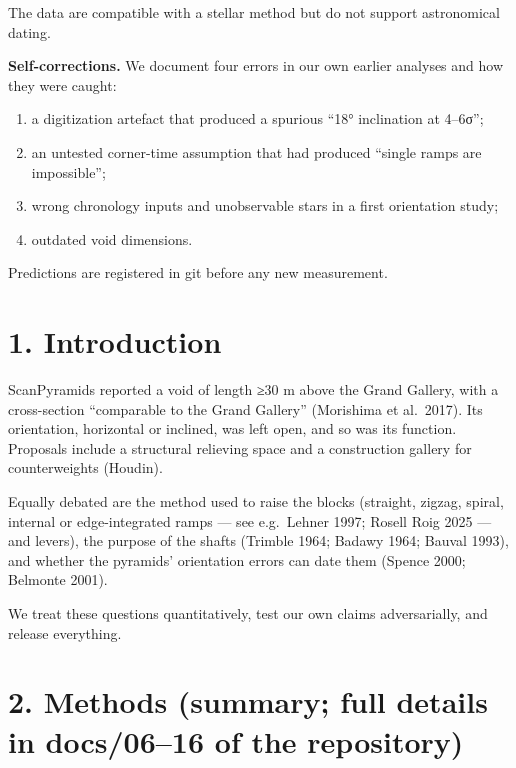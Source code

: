 \documentclass[
]{article}
\providecommand{\tightlist}{%
  \setlength{\itemsep}{0pt}\setlength{\parskip}{0pt}}
\begin{document}
The data are compatible with a stellar method but do not support
astronomical dating.

\textbf{Self-corrections.} We document four errors in our own earlier
analyses and how they were caught:

\begin{enumerate}
\def\labelenumi{\arabic{enumi}.}
\tightlist
\item
  a digitization artefact that produced a spurious ``18° inclination at
  4--6σ'';
\item
  an untested corner-time assumption that had produced ``single ramps
  are impossible'';
\item
  wrong chronology inputs and unobservable stars in a first orientation
  study;
\item
  outdated void dimensions.
\end{enumerate}

Predictions are registered in git before any new measurement.

\hypertarget{introduction}{%
\section{1. Introduction}\label{introduction}}

ScanPyramids reported a void of length ≥30 m above the Grand Gallery,
with a cross-section ``comparable to the Grand Gallery'' (Morishima et
al.~2017). Its orientation, horizontal or inclined, was left open, and
so was its function. Proposals include a structural relieving space and
a construction gallery for counterweights (Houdin).

Equally debated are the method used to raise the blocks (straight,
zigzag, spiral, internal or edge-integrated ramps --- see e.g.~Lehner
1997; Rosell Roig 2025 --- and levers), the purpose of the shafts
(Trimble 1964; Badawy 1964; Bauval 1993), and whether the pyramids'
orientation errors can date them (Spence 2000; Belmonte 2001).

We treat these questions quantitatively, test our own claims
adversarially, and release everything.

\hypertarget{methods-summary-full-details-in-docs0616-of-the-repository}{%
\section{2. Methods (summary; full details in docs/06--16 of the
repository)}\label{methods-summary-full-details-in-docs0616-of-the-repository}}
\end{document}
